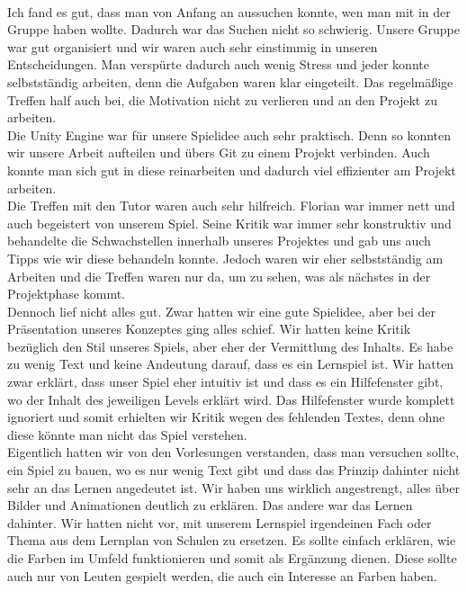 \documentclass[10pt,a4paper,notitlepage]{report}
\begin{document}
	\\\par\medskip\Text
	Ich fand es gut, dass man von Anfang an aussuchen konnte, wen man mit in der Gruppe haben wollte. Dadurch war das Suchen nicht so schwierig. Unsere Gruppe war gut organisiert und wir waren auch sehr einstimmig in unseren Entscheidungen. Man verspürte dadurch auch wenig Stress und jeder konnte selbstständig arbeiten, denn die Aufgaben waren klar eingeteilt. Das regelmäßige Treffen half auch bei, die Motivation nicht zu verlieren und an den Projekt zu arbeiten.\\
	Die Unity Engine war für unsere Spielidee auch sehr praktisch. Denn so konnten wir unsere Arbeit aufteilen und übers Git zu einem Projekt verbinden. Auch konnte man sich gut in diese reinarbeiten und dadurch viel effizienter am Projekt arbeiten.\\
	Die Treffen mit den Tutor waren auch sehr hilfreich. Florian war immer nett und auch begeistert von unserem Spiel. Seine Kritik war immer sehr konstruktiv und behandelte die Schwachstellen innerhalb unseres Projektes und gab uns auch Tipps wie wir diese behandeln konnte. Jedoch waren wir eher selbstständig am Arbeiten und die Treffen waren nur da, um zu sehen, was als nächstes in der Projektphase kommt.\\
	Dennoch lief nicht alles gut. Zwar hatten wir eine gute Spielidee, aber bei der Präsentation unseres Konzeptes ging alles schief. Wir hatten keine Kritik bezüglich den Stil unseres Spiels, aber eher der Vermittlung des Inhalts. Es habe zu wenig Text und keine Andeutung darauf, dass es ein Lernspiel ist. Wir hatten zwar erklärt, dass unser Spiel eher intuitiv ist und dass es ein Hilfefenster gibt, wo der Inhalt des jeweiligen Levels erklärt wird. Das Hilfefenster wurde komplett ignoriert und somit erhielten wir Kritik wegen des fehlenden Textes, denn ohne diese könnte man nicht das Spiel verstehen.\\
	Eigentlich hatten wir von den Vorlesungen verstanden, dass man versuchen sollte, ein Spiel zu bauen, wo es nur wenig Text gibt und dass das Prinzip dahinter nicht  sehr an das Lernen angedeutet ist. Wir haben uns wirklich angestrengt, alles über Bilder und Animationen deutlich zu erklären. Das andere war das Lernen dahinter. Wir hatten nicht vor, mit unserem Lernspiel irgendeinen Fach oder Thema aus dem Lernplan von Schulen zu ersetzen. Es sollte einfach erklären, wie die Farben im Umfeld funktionieren und somit als Ergänzung dienen. Diese sollte auch nur von Leuten gespielt werden, die auch ein Interesse an Farben haben.\\
	
\end{document}
